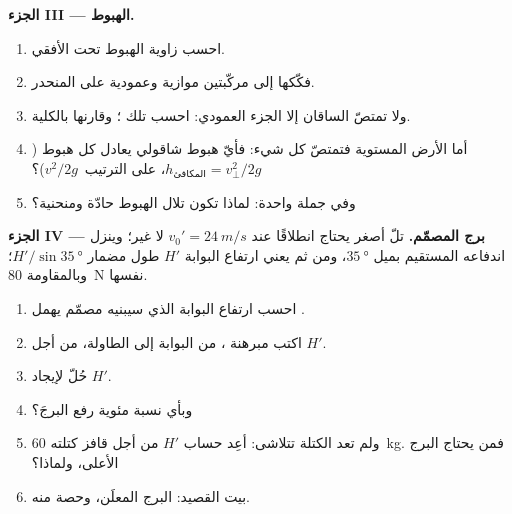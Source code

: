 \begin{problem}
\medskip\noindent\textbf{الجزء III --- الهبوط.}
\begin{enumerate}[resume]
  \item احسب زاوية  الهبوط تحت الأفقي.
  \item فكّكها إلى مركّبتين موازية وعمودية على
        المنحدر.
  \item ولا تمتصّ الساقان إلا الجزء العمودي: احسب تلك
        ؛ وقارنها بالكلية.
  \item أما الأرض المستوية فتمتصّ كل شيء: فأيّ هبوط شاقولي يعادل
        كل هبوط ($h_{\text{المكافئ}} = v_\perp^2/2g$،
        على الترتيب\ $v^2/2g$)؟
  \item وفي جملة واحدة: لماذا تكون تلال الهبوط حادّة ومنحنية؟
\end{enumerate}

\medskip\noindent\textbf{الجزء IV --- برج المصمّم.}
تلّ أصغر يحتاج انطلاقًا عند $v_0' = \qty{24}{m/s}$ لا غير؛ وينزل
 اندفاعه المستقيم بميل $\qty{35}{\degree}$، ومن ثم يعني ارتفاع البوابة $H'$
طول مضمار $H'/\sin\qty{35}{\degree}$؛ وبالمقاومة \qty{80}{N} نفسها.
\begin{enumerate}[resume]
  \item احسب ارتفاع البوابة الذي سيبنيه مصمّم يهمل .
  \item اكتب مبرهنة ، من البوابة إلى الطاولة، من أجل $H'$.
  \item حُلّ لإيجاد $H'$.
  \item وبأي نسبة مئوية رفع  البرجَ؟
  \item ولم تعد الكتلة تتلاشى: أعِد حساب $H'$ من أجل
        قافز كتلته \qty{60}{kg}. فمن يحتاج البرج الأعلى، ولماذا؟
  \item بيت القصيد: البرج المعلَن، وحصة  منه.
\end{enumerate}
\end{problem}
